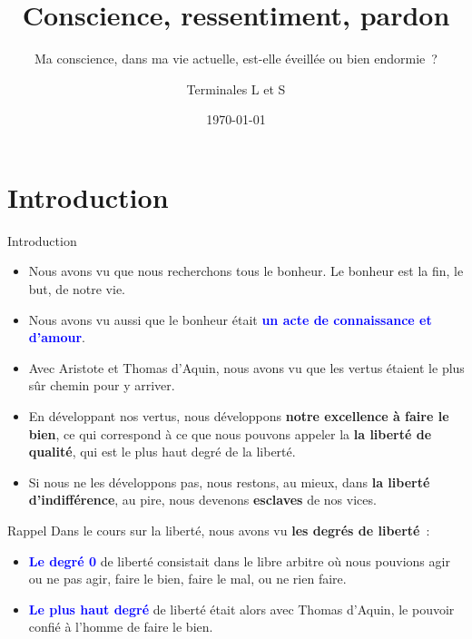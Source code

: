 \documentclass[11pt,xcolor=dvipsname,ignorenonframetext,handout]{beamer}
\title{Conscience, ressentiment, pardon}
\subtitle{Ma conscience, dans ma vie actuelle, est-elle éveillée ou bien endormie~?}
\author{Terminales L et S}
\institute{}
\date{\today}
\begin{document}
\begin{frame}
  \titlepage
\end{frame}

\section{Introduction}
\begin{frame}{Introduction}
    \begin{itemize}
        \rightskip=0pt\leftskip=0pt
        \item Nous avons vu que nous recherchons tous le bonheur. Le bonheur est la fin, le but, de notre vie.
        \item Nous avons vu aussi que le bonheur était \textcolor{blue}{\textbf{un acte de connaissance et d'amour}}.
        \item Avec Aristote et Thomas d'Aquin, nous avons vu que les vertus étaient le plus sûr chemin pour y arriver.
        \item En développant nos vertus, nous développons \textbf{notre excellence à faire le bien}, ce qui correspond à ce que nous pouvons appeler la \textbf{la liberté de qualité}, qui est le plus haut degré de la liberté.
        \item Si nous ne les développons pas, nous restons, au mieux, dans \textbf{la liberté d'indifférence}, au pire, nous devenons \textbf{esclaves} de nos vices.
    \end{itemize}  
\end{frame}
\begin{frame}{Rappel}
    \rightskip=0pt\leftskip=0pt
    Dans le cours sur la liberté, nous avons vu \textbf{les degrés de liberté}~:
    \begin{itemize}
        \rightskip=0pt\leftskip=0pt
        \item \textcolor{blue}{\textbf{Le degré 0}} de liberté consistait dans le libre arbitre où nous pouvions agir ou ne pas agir, faire le bien, faire le mal, ou ne rien faire.
        \item \textcolor{blue}{\textbf{Le plus haut degré}} de liberté était alors avec Thomas d'Aquin, le pouvoir confié à l'homme de faire le bien.
    \end{itemize}
\end{frame}
\end{document}
